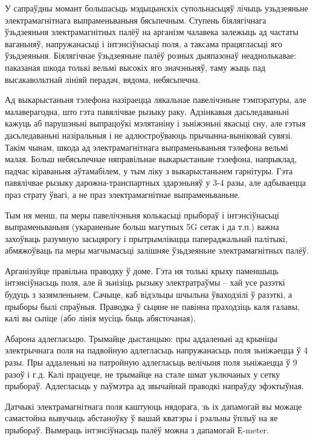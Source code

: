 У сапраўдны момант большасьць мэдыцынскіх супольнасьцяў лічыць узьдзеяньне электрамагнітнага выпраменьваньня бясьпечным. Ступень біялягічнага ўзьдзеяньня электрамагнітных палёў на арганізм чалавека залежыць ад частаты ваганьняў, напружанасьці і інтэнсіўнасьці поля, а таксама працягласьці яго ўзьдзеяньня. Біялягічнае ўзьдзеяньне палёў розных дыяпазонаў неаднолькавае: паказаная шкода толькі вельмі высокіх яго значэньняў, таму жыць пад высакавольтнай лініяй перадач, вядома, небясьпечна.

Ад выкарыстаньня тэлефона назіраецца лякальнае павелічэньне тэмпэратуры, але малаверагодна, што гэта павялічвае рызыку раку. Адзінкавыя дасьледаваньні кажуць аб парушэньні выпрацоўкі мэлятаніну і зьніжэньні якасьці сну, але гэтыя дасьледаваньні назіральныя і не адлюстроўваюць прычынна-выніковай сувязі. Такім чынам, шкода ад электрамагнітнага выпраменьваньня тэлефона вельмі малая. Больш небясьпечнае няправільнае выкарыстаньне тэлефона, напрыклад, падчас кіраваньня аўтамабілем, у тым ліку з выкарыстаньнем гарнітуры. Гэта павялічвае рызыку дарожна-транспартных здарэньняў у 3-4 разы, але адбываецца праз страту ўвагі, а не праз электрамагнітнае выпраменьваньне.

Тым ня менш, па меры павелічэньня колькасьці прыбораў і інтэнсіўнасьці выпраменьваньня (укараненьне больш магутных 5G сетак і да т.п.) важна захоўваць разумную засьцярогу і прытрымлівацца папераджальнай палітыкі, абмяжоўваць па меры магчымасьці залішняе ўзьдзеяньне электрамагнітных палёў.

Арганізуйце правільна праводку ў доме. Гэта ня толькі крыху паменшыць інтэнсіўнасьць поля, але й зьнізіць рызыку электратраўмы – хай усе разэткі будуць з зазямленьнем. Сачыце, каб відэльцы шчыльна ўваходзілі ў разэткі, а прыборы былі спраўныя. Праводка ў сьцяне не павінна праходзіць каля галавы, калі вы сьпіце (або лінія мусіць быць абясточаная).

Абарона адлегласьцю. Трымайце дыстанцыю: пры аддаленьні ад крыніцы электрычнага поля на падвойную адлегласьць напружанасьць поля зьніжаецца ў 4 разы. Пры аддаленьні на патройную адлегласьць велічыня поля зьніжаецца ў 9 разоў і г.д. Калі працуеце, не трымайце на стале шмат уключаных у сетку прыбораў. Адлегласьць у паўмэтра ад звычайнай праводкі напраўду эфэктыўная.

Датчыкі электрамагнітнага поля каштуюць нядорага, зь іх дапамогай вы можаце самастойна вывучыць абстаноўку ў вашай кватэры і рэальны ўплыў на яе прыбораў. Вымераць інтэнсіўнасьць палёў можна з дапамогай Е-meter.

